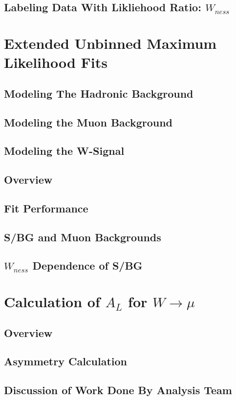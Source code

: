 \subsection{Labeling Data With Likliehood Ratio: $W_{ness}$}
\label{sec:likelihood}
\section{Extended Unbinned Maximum Likelihood Fits}
\subsection{Modeling The Hadronic Background}
\subsection{Modeling the Muon Background}
\subsection{Modeling the W-Signal}
\subsection{Overview}
\subsection{Fit Performance}
\subsection{S/BG and Muon Backgrounds}
\label{sec:sbr}
\subsection{$W_{ness}$ Dependence of S/BG}
\section{Calculation of $A_{L}$ for $W\rightarrow\mu$}
\subsection{Overview}
\subsection{Asymmetry Calculation}
\subsection{Discussion of Work Done By Analysis Team}
